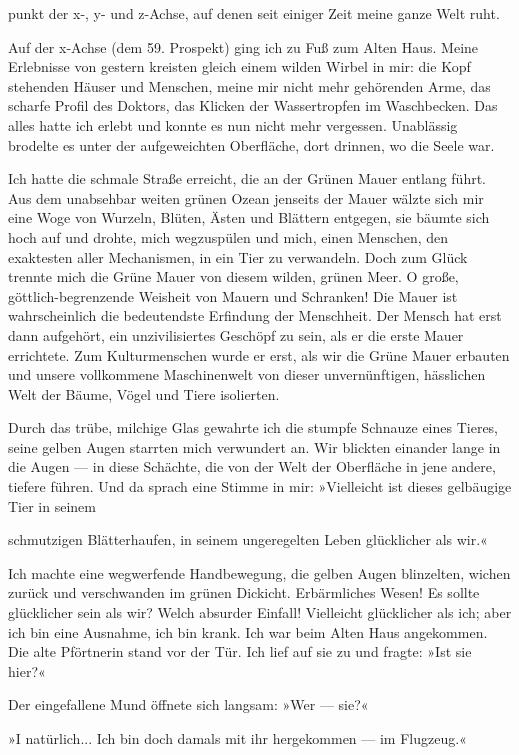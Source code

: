 punkt der x-, y- und z-Achse, auf denen seit einiger Zeit meine
ganze Welt ruht.

Auf der x-Achse (dem 59. Prospekt) ging ich zu Fuß zum Alten Haus.
Meine Erlebnisse von gestern kreisten gleich einem wilden Wirbel in
mir: die Kopf stehenden Häuser und Menschen, meine mir nicht mehr
gehörenden Arme, das scharfe Profil des Doktors, das Klicken der
Wassertropfen im Waschbecken. Das alles hatte ich erlebt und konnte
es nun nicht mehr vergessen. Unablässig brodelte es unter der
aufgeweichten Oberfläche, dort drinnen, wo die Seele war.

Ich hatte die schmale Straße erreicht, die an der Grünen Mauer
entlang führt. Aus dem unabsehbar weiten grünen Ozean jenseits der
Mauer wälzte sich mir eine Woge von Wurzeln, Blüten, Ästen und
Blättern entgegen, sie bäumte sich hoch auf und drohte, mich
wegzuspülen und mich, einen Menschen, den exaktesten aller
Mechanismen, in ein Tier zu verwandeln. Doch zum Glück trennte mich
die Grüne Mauer von diesem wilden, grünen Meer. O große,
göttlich-begrenzende Weisheit von Mauern und Schranken! Die Mauer
ist wahrscheinlich die bedeutendste Erfindung der Menschheit. Der
Mensch hat erst dann aufgehört, ein unzivilisiertes Geschöpf zu
sein, als er die erste Mauer errichtete. Zum Kulturmenschen wurde
er erst, als wir die Grüne Mauer erbauten und unsere vollkommene
Maschinenwelt von dieser unvernünftigen, hässlichen Welt der Bäume,
Vögel und Tiere isolierten.

Durch das trübe, milchige Glas gewahrte ich die stumpfe Schnauze
eines Tieres, seine gelben Augen starrten mich verwundert an. Wir
blickten einander lange in die Augen — in diese Schächte, die von
der Welt der Oberfläche in jene andere, tiefere führen. Und da
sprach eine Stimme in mir: »Vielleicht ist dieses gelbäugige Tier
in seinem

schmutzigen Blätterhaufen, in seinem ungeregelten Leben glücklicher
als wir.«

Ich machte eine wegwerfende Handbewegung, die gelben Augen
blinzelten, wichen zurück und verschwanden im grünen Dickicht.
Erbärmliches Wesen! Es sollte glücklicher sein als wir? Welch
absurder Einfall! Vielleicht glücklicher als ich; aber ich bin eine
Ausnahme, ich bin krank. Ich war beim Alten Haus angekommen. Die
alte Pförtnerin stand vor der Tür. Ich lief auf sie zu und fragte:
»Ist sie hier?«

Der eingefallene Mund öffnete sich langsam: »Wer — sie?«

»I natürlich... Ich bin doch damals mit ihr hergekommen — im
Flugzeug.«

